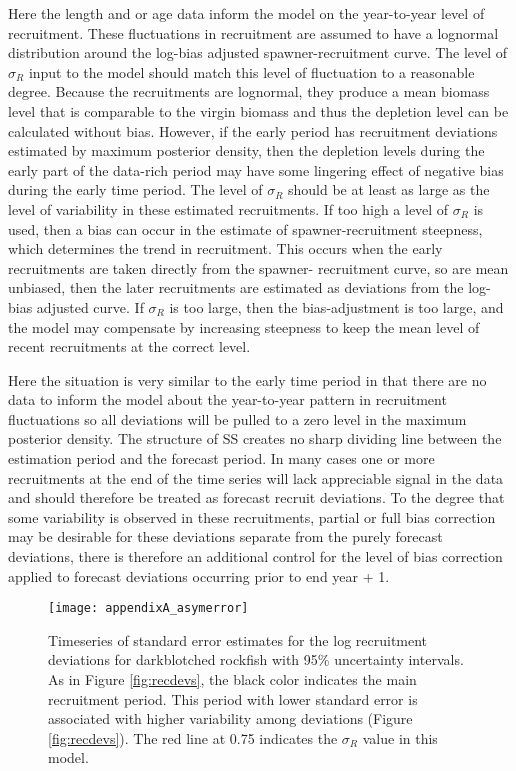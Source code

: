 Here the length and or age data inform the model on the year-to-year level of recruitment.  These fluctuations in recruitment are assumed to have a lognormal distribution around the log-bias adjusted spawner-recruitment curve.  The level of $\sigma_R$ input to the model should match this level of fluctuation to a reasonable degree.  Because the recruitments are lognormal, they produce a mean biomass level that is comparable to the virgin biomass and thus the depletion level can be calculated without bias.  However, if the early period has recruitment deviations estimated by maximum posterior density, then the depletion levels during the early part of the data-rich period may have some lingering effect of negative bias during the early time period. The level of $\sigma_R$ should be at least as large as the level of variability in these estimated recruitments.  If too high a level of $\sigma_R$ is used, then a bias can occur in the estimate of spawner-recruitment steepness, which determines the trend in recruitment.  This occurs when the early recruitments are taken directly from the spawner- recruitment curve, so are mean unbiased, then the later recruitments are estimated as deviations from the log-bias adjusted curve.  If $\sigma_R$ is too large, then the bias-adjustment is too large, and the model may compensate by increasing steepness to keep the mean level of recent recruitments at the correct level.

Here the situation is very similar to the early time period in that there are no data to inform the model about the year-to-year pattern in recruitment fluctuations so all deviations will be pulled to a zero level in the maximum posterior density.  The structure of SS creates no sharp dividing line between the estimation period and the forecast period.  In many cases one or more recruitments at the end of the time series will lack appreciable signal in the data and should therefore be treated as forecast recruit deviations.  To the degree that some variability is observed in these recruitments, partial or full bias correction may be desirable for these deviations separate from the purely forecast deviations, there is therefore an additional control for the level of bias correction applied to forecast deviations occurring prior to end year + 1.

\begin{figure}[H]
	\begin{center}
	\texttt{[image: appendixA\_asymerror]}\\
	\end{center}
	\caption{ Timeseries of standard error estimates for the log recruitment deviations for darkblotched rockfish with 95\% uncertainty intervals. As in Figure \ref{fig:recdevs}, the black color indicates the main recruitment period. This period with lower standard error is associated with higher variability among deviations (Figure \ref{fig:recdevs}). The red line at 0.75 indicates the  $\sigma_R$ value in this model.}
	\label{fig:recSE}
\end{figure}


